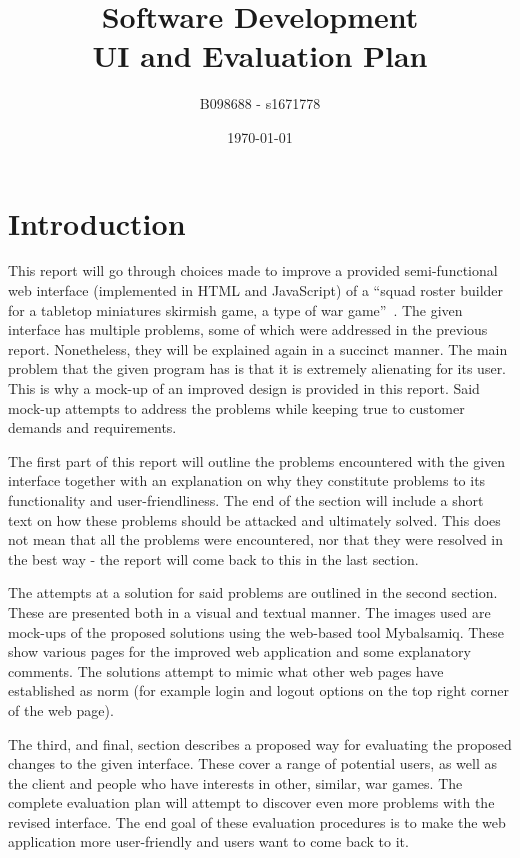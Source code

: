 \documentclass[12pt,a4paper]{article}
\begin{document}
\title{Software Development\\UI and Evaluation Plan}
\author{B098688 - s1671778}
\date{\today}

\makeEPCCtitle

\thispagestyle{empty}

\newpage


\tableofcontents


\newpage
{}

\section{Introduction}

This report will go through choices made to improve a provided semi-functional web interface (implemented in HTML and JavaScript) of a ``squad roster builder for a tabletop miniatures skirmish game, a type of war game''~\cite{soft_dev}. The given interface has multiple problems, some of which were addressed in the previous report. Nonetheless, they will be explained again in a succinct manner. The main problem that the given program has is that it is extremely alienating for its user. This is why a mock-up of an improved design is provided in this report. Said mock-up attempts to address the problems while keeping true to customer demands and requirements. 

The first part of this report will outline the problems encountered with the given interface together with an explanation on why they constitute problems to its functionality and user-friendliness. The end of the section will include a short text on how these problems should be attacked and ultimately solved. This does not mean that all the problems were encountered, nor that they were resolved in the best way - the report will come back to this in the last section.

The attempts at a solution for said problems are outlined in the second section. These are presented both in a visual and textual manner. The images used are mock-ups of the proposed solutions using the web-based tool Mybalsamiq. These show various pages for the improved web application and some explanatory comments. The solutions attempt to mimic what other web pages have established as norm (for example login and logout options on the top right corner of the web page).

The third, and final, section describes a proposed way for evaluating the proposed changes to the given interface. These cover a range of potential users, as well as the client and people who have interests in other, similar, war games. The complete evaluation plan will attempt to discover even more problems with the revised interface. The end goal of these evaluation procedures is to make the web application more user-friendly and users want to come back to it.
\end{document}
